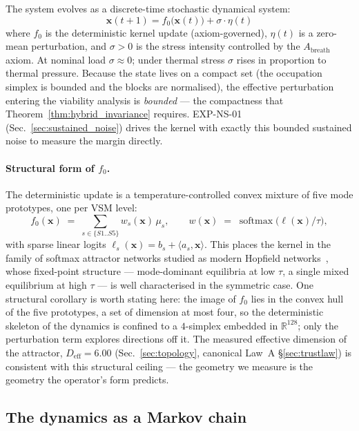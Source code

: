 \documentclass[11pt, a4paper]{article}
\newcommand{\R}{\mathbb{R}}
\newcommand{\sv}{\bm{x}}
\begin{document}
The system evolves as a discrete-time stochastic dynamical system:
\begin{equation}
  \sv(t+1) = f_0\bigl(\sv(t)\bigr) + \sigma \cdot \eta(t)
\label{eq:dynamics}
\end{equation}
where $f_0$ is the deterministic kernel update (axiom-governed),
$\eta(t)$ is a zero-mean perturbation, and $\sigma > 0$ is the stress intensity
controlled by the $A_\text{breath}$ axiom.
At nominal load $\sigma \approx 0$; under thermal stress $\sigma$
rises in proportion to thermal pressure.
Because the state lives on a compact set (the occupation simplex is bounded and
the blocks are normalised), the effective perturbation entering the viability
analysis is \emph{bounded} --- the compactness that
Theorem~\ref{thm:hybrid_invariance} requires. EXP-NS-01
(Sec.~\ref{sec:sustained_noise}) drives the kernel with exactly this bounded
sustained noise to measure the margin directly.

\paragraph{Structural form of $f_0$.}
The deterministic update is a temperature-controlled convex mixture of five
mode prototypes, one per VSM level:
\begin{equation}
  f_0(\sv) \;=\; \sum_{s \in \{S1..S5\}} w_s(\sv)\,\mu_s,
  \qquad
  w(\sv) \;=\; \operatorname{softmax}\!\bigl(\ell(\sv)/\tau\bigr),
\label{eq:softmax_mixing}
\end{equation}
with sparse linear logits $\ell_s(\sv) = b_s + \langle a_s, \sv\rangle$.
This places the kernel in the family of softmax attractor networks studied
as modern Hopfield networks~\cite{ramsauer2021hopfield}, whose fixed-point
structure --- mode-dominant equilibria at low $\tau$, a single mixed
equilibrium at high $\tau$ --- is well characterised in the symmetric case.
One structural corollary is worth stating here: the image of $f_0$ lies in
the convex hull of the five prototypes, a set of dimension at most four, so
the deterministic skeleton of the dynamics is confined to a $4$-simplex
embedded in $\R^{128}$; only the perturbation term explores directions off
it. The measured effective dimension of the attractor, $D_\text{eff} = 6.00$
(Sec.~\ref{sec:topology}, canonical Law~A \S\ref{sec:trustlaw}) is consistent
with this structural ceiling --- the geometry we measure is the geometry
the operator's form predicts.

\subsection{The dynamics as a Markov chain}
\label{sec:markov}
\end{document}

